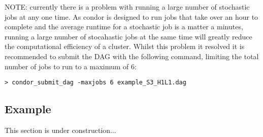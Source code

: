 NOTE: currently there is a problem with running a large number of
stochastic jobs at any one time. As condor is designed to run jobs that
take over an hour to complete and the average runtime for a stochastic
job is a matter a minutes, running a large number of stocahastic jobs at
the same time will greatly reduce the computational efficiency of a
cluster. Whilst this problem it resolved it is recommended to submit the
DAG with the following command, limiting the total number of jobs to run
to a maximum of 6:

\begin{verbatim}
> condor_submit_dag -maxjobs 6 example_S3_H1L1.dag
\end{verbatim}

\subsection{Example}

This section is under construction...
